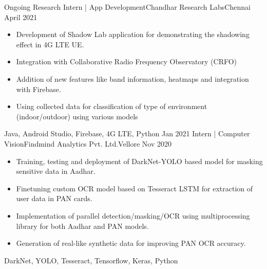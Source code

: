 %
%
%
\begin{experiences}
  \experience
    {Ongoing}   {Research Intern | App Development}{Chandhar Research Labs}{Chennai}
    {April 2021} {
                      \begin{itemize}
                        \item Development of Shadow Lab application for demonstrating the shadowing effect in 4G LTE UE.                       
                        \item Integration with Collaborative Radio Frequency Observatory (CRFO)
                        \item Addition of new features like band information, heatmaps and integration with Firebase.
                        \item Using collected data for classification of type of environment (indoor/outdoor) using various models
                      \end{itemize}
                    }
                    {Java, Android Studio, Firebase, 4G LTE, Python}
  \emptySeparator
  \experience
    {Jan 2021}   {Intern | Computer Vision}{Findmind Analytics Pvt. Ltd.}{Vellore}
    {Nov 2020} {
                      \begin{itemize}
                        \item Training, testing and deployment of DarkNet-YOLO based model for masking sensitive data in Aadhar.                       
                        \item Finetuning custom OCR model based on Tesseract LSTM for extraction of user data in PAN cards.
                        \item Implementation of parallel detection/masking/OCR using multiprocessing library for both Aadhar and PAN models.                        
                        \item Generation of real-like synthetic data for improving PAN OCR accuracy. 
                      \end{itemize}
                    }
                    {DarkNet, YOLO, Tesseract, Tensorflow, Keras, Python}

\end{experiences}
